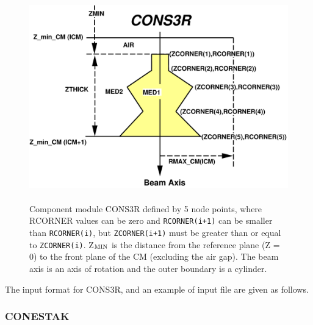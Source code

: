 \documentclass[12pt,twoside]{article}
\begin{document}
\begin{figure}[htbp]
\begin{center}
\leavevmode
\mbox{}\hspace{0cm}
\includegraphics[height=9cm]{figures/cons3rd}
\caption[CONS3R CM geometry]
{Component module CONS3R defined by 5 node points, where RCORNER values can be
zero
and {\tt RCORNER(i+1)} can be smaller than {\tt RCORNER(i)}, but {\tt ZCORNER(i+1)} must be greater than or equal
to {\tt ZCORNER(i)}.  Z$_{\rm MIN}$ is the distance from the reference plane (Z = 0) to
the
front plane of the CM (excluding the air gap). The beam axis is an axis
of rotation and the outer boundary is a cylinder.}
\label{fig_CONS3RD}
\end{center}
\end{figure}

\clearpage

The input format for CONS3R, and an example of input file are given as follows.

\begin{small}
%

\end{small}

\newpage



\subsubsection{CONESTAK}
\renewcommand{\rightmark}{CONESTAK CM}
\end{document}
